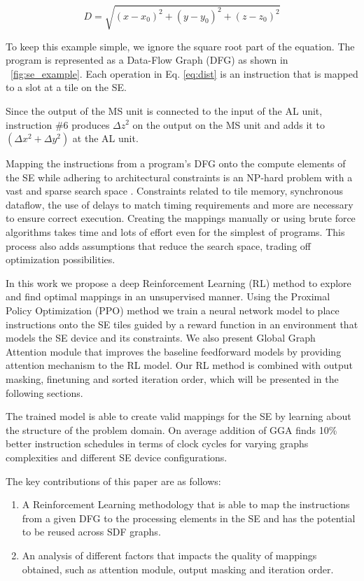 \begin{equation}
    \label{eq:dist}
    D = \sqrt{(x - x_0)^2 +(y - y_0)^2 + (z - z_0)^2}
\end{equation}

To keep this example simple, we ignore the square root part of the equation.
The program is represented as a Data-Flow Graph (DFG) as shown in \figurename~\ref{fig:se_example}.
Each operation in Eq. \ref{eq:dist} is an instruction that is mapped to a slot at a tile on the SE.

Since the output of the MS unit is connected to the input of the AL unit, instruction \#6 produces $\Delta z^2$ on the output on the MS unit and adds it to $(\Delta x^2 + \Delta y^2)$ at the AL unit.


Mapping the instructions from a program's DFG onto the compute elements of the SE while adhering to architectural constraints is an NP-hard problem with a vast and sparse search space \cite{10.1007/3-540-69346-7_30}. 
Constraints related to tile memory, synchronous dataflow, the use of delays to match timing requirements and more are necessary to ensure correct execution. 
Creating the mappings manually or using brute force algorithms takes time and lots of effort even for the simplest of programs. 
This process also adds assumptions that reduce the search space, trading off optimization possibilities.  

In this work we propose a deep Reinforcement Learning (RL) method to explore and find optimal mappings in an unsupervised manner. 
Using the Proximal Policy Optimization (PPO) method we train a neural network model to place instructions onto the SE tiles guided by a reward function in an environment that models the SE device and its constraints. 
We also present Global Graph Attention module that improves the baseline feedforward models by providing attention mechanism to the RL model.
Our RL method is combined with output masking, finetuning and sorted iteration order, which will be presented in the following sections.

The trained model is able to create valid mappings for the SE by learning about the structure of the problem domain.
On average addition of GGA finds 10\% better instruction schedules in terms of clock cycles for varying graphs complexities and different SE device configurations.

The key contributions of this paper are as follows:
\begin{enumerate}
    \item A Reinforcement Learning methodology that is able to map the instructions from a given DFG to the processing elements in the SE and has the potential to be reused across SDF graphs.
    \item An analysis of different factors that impacts the quality of mappings obtained, such as attention module, output masking and iteration order.
\end{enumerate}

